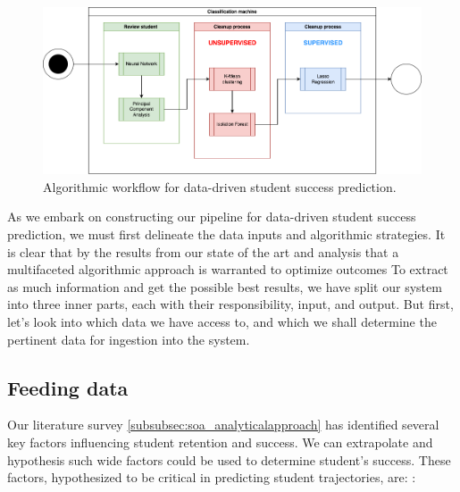 \documentclass[../main.tex]{subfiles}
\begin{document}
\begin{figure}[h!]      
    \includegraphics[width=1\linewidth]{res//diagram/ML Workflow.png}
    \caption{Algorithmic workflow for data-driven student success prediction.}
    \label{fig:dataworkflow}
\end{figure}
As we embark on constructing our pipeline for data-driven student success prediction, we must first delineate the data inputs and algorithmic strategies. 
It is clear that by the results from our state of the art and analysis that a multifaceted algorithmic approach is warranted to optimize outcomes
To extract as much information and get the possible best results, we have split our system into three inner parts, each with their responsibility, input, and output.
But first, let's look into which data we have access to, and which we shall determine the pertinent data for ingestion into the system.

\subsection{Feeding data}
\label{subsec:conprop_feedingdata}
Our literature survey \ref{subsubsec:soa_analyticalapproach} has identified several key factors influencing student retention and success. We can extrapolate and hypothesis such wide factors could be used to determine student's success.
These factors, hypothesized to be critical in predicting student trajectories, are: \cite{opazo_analysis_2021,tinto_dropout_1975,caspersen_teachers_2015,lidia_problema_2006,bejarano_caso_2017,sinchi_acceso_2018,cavero_voluntad_2011,velasco_alisis_nodate}: 
\end{document}
